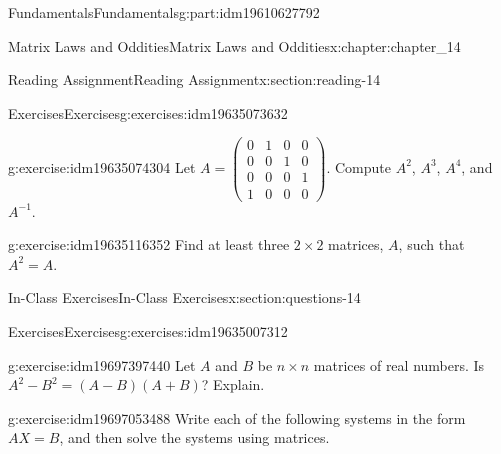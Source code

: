 \documentclass[oneside,10pt,]{book}
\numberwithin{equation}{section}
\begin{document}
\begin{partptx}{Fundamentals}{}{Fundamentals}{}{}{g:part:idm19610627792}
\begin{chapterptx}{Matrix Laws and Oddities}{}{Matrix Laws and Oddities}{}{}{x:chapter:chapter_14}
\begin{sectionptx}{Reading Assignment}{}{Reading Assignment}{}{}{x:section:reading-14}
\typeout{************************************************}
%
\begin{exercises-subsection-numberless}{Exercises}{}{Exercises}{}{}{g:exercises:idm19635073632}
\par\medskip\noindent%
%
\begin{exercisegroup}
\begin{divisionexerciseeg}{1}{}{}{g:exercise:idm19635074304}%
Let \(A=\left(\begin{array}{cccc} 0 &1&0&0\\
0 &0&1&0\\
0&0&0&1\\
1 &0&0&0 \end{array}\right)\). Compute \(A^2\), \(A^3\), \(A^4\), and \(A^{-1}\).%
\end{divisionexerciseeg}%
\begin{divisionexerciseeg}{2}{}{}{g:exercise:idm19635116352}%
Find at least three \(2\times2\) matrices, \(A\), such that \(A^2=A\).%
\end{divisionexerciseeg}%
\end{exercisegroup}
\par\medskip\noindent
\end{exercises-subsection-numberless}
\end{sectionptx}
%
%
\typeout{************************************************}
\typeout{************************************************}
%
\begin{sectionptx}{In-Class Exercises}{}{In-Class Exercises}{}{}{x:section:questions-14}
%
%
%
\typeout{************************************************}
\typeout{************************************************}
%
\begin{exercises-subsection-numberless}{Exercises}{}{Exercises}{}{}{g:exercises:idm19635007312}
\par\medskip\noindent%
%
\begin{exercisegroup}
\begin{divisionexerciseeg}{1}{}{}{g:exercise:idm19697397440}%
Let \(A\) and \(B\) be \(n\times n\) matrices of real numbers. Is \(A^2-B^2= (A-B)(A+B)\)?  Explain.%
\end{divisionexerciseeg}%
\begin{divisionexerciseeg}{2}{}{}{g:exercise:idm19697053488}%
Write each of the following systems in the form \(A X = B\), and then solve the systems using matrices.%
\par

\end{divisionexerciseeg}
\end{exercisegroup}
\end{exercises-subsection-numberless}
\end{sectionptx}
\end{chapterptx}
\end{partptx}
\end{document}

